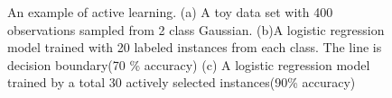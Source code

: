 \begin{figure}[htb] 
\centering
{}
\caption{An example of active learning. (a) A toy data set with 400 observations sampled from 2 class Gaussian. (b)A logistic regression model trained with 20 labeled instances from each class. The line is decision boundary(70 \% accuracy) (c) A logistic regression model trained by a total 30 actively selected instances(90\% accuracy)}\label{active_comparison}
\end{figure}
